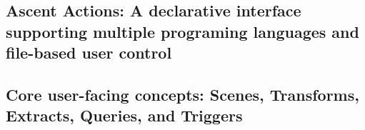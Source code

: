\subsection{Ascent Actions: A declarative interface supporting multiple programing languages and file-based user control}

\subsection{Core user-facing concepts: Scenes, Transforms, Extracts, Queries, and Triggers}
